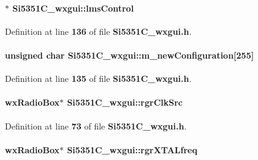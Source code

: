 \paragraph[{lms\+Control}]{$\ast$ Si5351\+C\+\_\+wxgui\+::lms\+Control\hspace{0.3cm}{\ttfamily [private]}}\label{classSi5351C__wxgui_a6c28ff24acf4328179d7a931dcb9e71b}


Definition at line {\bf 136} of file {\bf Si5351\+C\+\_\+wxgui.\+h}.

\paragraph[{m\+\_\+new\+Configuration}]{\setlength{\rightskip}{0pt plus 5cm}unsigned char Si5351\+C\+\_\+wxgui\+::m\+\_\+new\+Configuration[255]\hspace{0.3cm}{\ttfamily [private]}}\label{classSi5351C__wxgui_a06918a19efdf08e2df49be9cbad87a57}


Definition at line {\bf 135} of file {\bf Si5351\+C\+\_\+wxgui.\+h}.

\paragraph[{rgr\+Clk\+Src}]{\setlength{\rightskip}{0pt plus 5cm}wx\+Radio\+Box$\ast$ Si5351\+C\+\_\+wxgui\+::rgr\+Clk\+Src}\label{classSi5351C__wxgui_aaf98c566ee5cb470bfe0bb51d910e6a1}


Definition at line {\bf 73} of file {\bf Si5351\+C\+\_\+wxgui.\+h}.

\paragraph[{rgr\+X\+T\+A\+Lfreq}]{\setlength{\rightskip}{0pt plus 5cm}wx\+Radio\+Box$\ast$ Si5351\+C\+\_\+wxgui\+::rgr\+X\+T\+A\+Lfreq}\label{classSi5351C__wxgui_aa4ef4b429b03b2c727955441ca821563}


